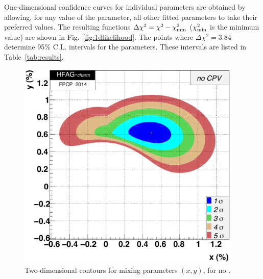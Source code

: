 One-dimensional confidence curves for individual parameters 
are obtained by allowing, for any value of the parameter, all other 
fitted parameters to take their preferred values. The resulting
functions $\Delta\chi^2=\chi^2-\chi^2_{\rm min}$ ($\chi^2_{\rm min}$
is the minimum value) are shown in Fig.~\ref{fig:1dlikelihood}.
The points where $\Delta\chi^2=3.84$ determine 95\% C.L. intervals 
for the parameters. These intervals are listed in Table~\ref{tab:results}.


\begin{figure}
\begin{center}
\includegraphics[width=4.2in]{figures/charm/fig_plot_xyn2d}
\end{center}
\vskip-0.20in
\caption{\label{fig:contours_ncpv}
Two-dimensional contours for mixing parameters $(x,y)$, for no \cpv. }
\end{figure}


